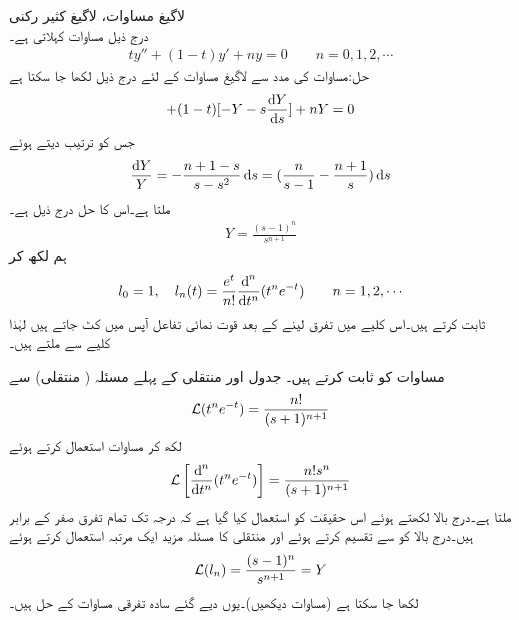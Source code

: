 \quad لاگیغ مساوات، لاگیغ کثیر رکنی\\
درج ذیل  مساوات کہلاتی ہے۔ 
\begin{align}\label{مساوات_لاپلاس_لاگیغ_کی_مساوات}
ty''+(1-t)y'+ny=0\quad \quad n=0,1,2,\cdots
\end{align}
حل:مساوات  کی مدد سے لاگیغ مساوات کے لئے درج ذیل لکھا جا سکتا ہے
\begin{align*}
[-2sY-s^2\frac{\dif Y}{\dif s}+y(0)]+(1-t)[-Y-s\frac{\dif Y}{\dif s}]+nY=0
\end{align*}
جس کو ترتیب دیتے ہوئے
\begin{align*}
\frac{\dif Y}{Y}=-\frac{n+1-s}{s-s^2}\dif s=(\frac{n}{s-1}-\frac{n+1}{s})\dif s
\end{align*}
ملتا ہے۔اس کا حل درج ذیل ہے۔
\begin{align}
Y=\frac{(s-1)^n}{s^{n+1}}
\end{align}
ہم  لکھ کر 
\begin{align}\label{مساوات_لاپلاس_روڈریکیس_کثیر_رکنی}
l_0=1,\quad l_n(t)=\frac{e^t}{n!}\frac{\dif^{\,n}}{\dif t^n}(t^ne^{-t})\quad \quad n=1,2,\cdots
\end{align}
ثابت کرتے ہیں۔اس کلیے میں تفرق لینے کے بعد قوت نمائی تفاعل آپس میں کٹ جاتے ہیں لہٰذا کلیے سے  ملتے ہیں۔ 

مساوات  کو ثابت کرتے ہیں۔ جدول  اور منتقلی کے پہلے مسئلہ ( منتقلی) سے
\begin{align}
\mathcal{L}(t^ne^{-t})=\frac{n!}{(s+1)^{n+1}}
\end{align}
لکھ کر مساوات  استعمال کرتے ہوئے
\begin{align*}
\Laplace\left[\frac{\dif^{\,n}}{\dif t^n} (t^ne^{-t})\right]=\frac{n!s^n}{(s+1)^{n+1}}
\end{align*}
ملتا ہے۔درج بالا لکھتے ہوئے اس حقیقت کو استعمال کیا گیا ہے کہ درجہ  تک تمام تفرق صفر کے برابر ہیں۔درج بالا کو  سے تقسیم کرتے ہوئے اور منتقلی کا مسئلہ مزید ایک مرتبہ استعمال کرتے ہوئے
\begin{align*}
\mathcal{L}(l_n)=\frac{(s-1)^n}{s^{n+1}}=Y
\end{align*}
لکھا جا سکتا ہے (مساوات  دیکھیں)۔یوں  دیے گئے سادہ تفرقی مساوات کے حل ہیں۔

